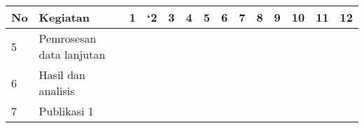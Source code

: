 \begin{spacing}{1.5}
\begin{table}[htp]
\begin{tabular}{|l|l|llllllllllll|}
		\multicolumn{1}{|c|}{\multirow{-2}{*}{No}} & \multirow{-2}{*}{Kegiatan}                                                           & \multicolumn{1}{c|}{1}                        & \multicolumn{1}{c|}{`2}                       & \multicolumn{1}{c|}{3}                        & \multicolumn{1}{c|}{4}                        & \multicolumn{1}{c|}{5}                        & \multicolumn{1}{c|}{6}                        & \multicolumn{1}{c|}{7}                        & \multicolumn{1}{c|}{8}                        & \multicolumn{1}{c|}{9}                        & \multicolumn{1}{c|}{10}                       & \multicolumn{1}{c|}{11}                       & \multicolumn{1}{c|}{12}  \\ \hline
		5                                          & Pemrosesan data lanjutan                                                             & \multicolumn{1}{l|}{\cellcolor[HTML]{343434}} & \multicolumn{1}{l|}{\cellcolor[HTML]{343434}} & \multicolumn{1}{l|}{}                         & \multicolumn{1}{l|}{}                         & \multicolumn{1}{l|}{}                         & \multicolumn{1}{l|}{}                         & \multicolumn{1}{l|}{}                         & \multicolumn{1}{l|}{}                         & \multicolumn{1}{l|}{}                         & \multicolumn{1}{l|}{}                         & \multicolumn{1}{l|}{}                         &                          \\ \hline
		6                                          & Hasil dan analisis                                                                   & \multicolumn{1}{l|}{}                         & \multicolumn{1}{l|}{}                         & \multicolumn{1}{l|}{\cellcolor[HTML]{343434}} & \multicolumn{1}{l|}{\cellcolor[HTML]{343434}} & \multicolumn{1}{l|}{}                         & \multicolumn{1}{l|}{}                         & \multicolumn{1}{l|}{}                         & \multicolumn{1}{l|}{}                         & \multicolumn{1}{l|}{}                         & \multicolumn{1}{l|}{}                         & \multicolumn{1}{l|}{}                         &                          \\ \hline
		7                                          & Publikasi 1                                                                          & \multicolumn{1}{l|}{}                         & \multicolumn{1}{l|}{}                         & \multicolumn{1}{l|}{}                         & \multicolumn{1}{l|}{}                         & \multicolumn{1}{l|}{\cellcolor[HTML]{343434}} & \multicolumn{1}{l|}{\cellcolor[HTML]{343434}} & \multicolumn{1}{l|}{\cellcolor[HTML]{343434}} & \multicolumn{1}{l|}{}                         & \multicolumn{1}{l|}{}                         & \multicolumn{1}{l|}{}                         & \multicolumn{1}{l|}{}                         &                          \\ \hline

\end{tabular}
\end{table}
\end{spacing}
